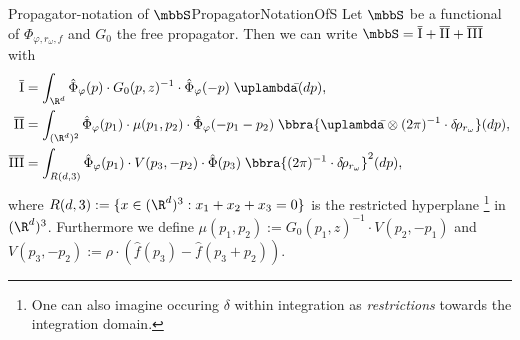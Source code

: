 \begin{mcor}{Propagator-notation of $\mbbS$}{PropagatorNotationOfS}
    Let $\mbbS$ be a functional of $\Phi_{\varphi,r_\omega,f}$ and $G_0$ the free propagator. Then we can write $\mbbS = \overline{\text{I}} + \overline{\text{II}} + \overline{\text{III}}$ with 
    \begin{align*}
        \overline{\text{I}} &= \int_{\R^d}\hat\Phi_\varphi(p)\cdot G_0(p,z)^{-1}\cdot\hat\Phi_\varphi(-p)\;\uplambdabar(d p), \\
        \overline{\text{II}} &= \int_{(\R^d)^2}\hat\Phi_\varphi(p_1)\cdot \mu(p_1,p_2)\cdot\hat\Phi_\varphi(-p_1-p_2)\;\bbra{\uplambdabar\otimes(2\pi)^{-1}\cdot\drho_{r_\omega}}(dp), \\
        \overline{\text{III}} &= \int_{R(d,3)}\hat\Phi_\varphi(p_1)\cdot V(p_3,-p_2)\cdot\hat\Phi(p_3)\;\bbra{(2\pi)^{-1}\cdot\drho_{r_\omega}}^2(dp),
    \end{align*}
    where $R(d,3) := \{x\in(\R^d)^3:x_1 + x_2 + x_3 = 0\}$ is the restricted hyperplane%
    \footnote{One can also imagine occuring $\delta$ within integration as \emph{restrictions} towards the integration domain.}
    in $(\R^d)^3$. Furthermore we define $\mu(p_1,p_2) := G_0(p_1,z)^{-1}\cdot V(p_2,-p_1)$ and $V(p_3,-p_2) := \rho\cdot (\hat f(p_3) - \hat f(p_3 + p_2))$.
\end{mcor}